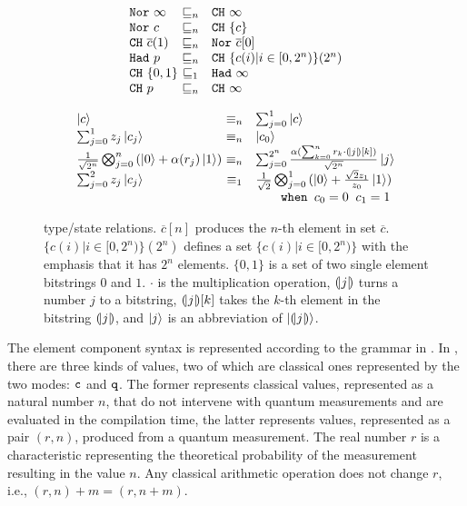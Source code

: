 \begin{figure}
{\small
{\hspace*{-6em}
\begin{minipage}[t]{0.4\textwidth}
\begin{center}
 \[
  \begin{array}{l@{~}cl}
  \tnor{\infty} &\sqsubseteq_n& \tch{\infty}\\
  \tnor{c} &\sqsubseteq_n& \tch{\{c\}}\\
  \tch{\overline{c}(1)} &\sqsubseteq_n& \tnor{\overline{c}[0]}\\
  \thad{p} &\sqsubseteq_n& \tch{\{c(i)|i\in[0,2^n)\}(2^n)}\\
  \tch{\{0,1\}} &\sqsubseteq_1& \thad{\infty}\\
  \tch{p} &\sqsubseteq_n& \tch{\infty}
    \end{array}
  \]
\end{center}
  \label{fig:qafny-subtype}
\end{minipage}
\qquad
\begin{minipage}[t]{0.45\textwidth}
\begin{center}
   \[
   \begin{array}{l@{~}cl}
  \ket{c} &\equiv_n& \sch{1}{ }{c}\\
  \sch{1}{z_j}{c_j} &\equiv_n& \ket{c_0}\\
  \shad{2^n}{n}{\alpha(r_j)} &\equiv_n& \sch{2^n}{\frac{\alpha(\sum_{k=0}^{n} r_k \cdot \tos{j}[k])}{\sqrt{2^n}}}{j}\\
  \sch{2}{z_j}{c_j} &\equiv_1& \shad{2}{1}{\frac{\sqrt{2}z_1}{z_0}}\\
   &&\qquad\texttt{when }c_0=0\;\;c_1=1
    \end{array}
 \]
\end{center}
  \label{fig:qafny-sequiv}
\end{minipage}
  \caption{\qafny type/state relations. $\overline{c}[n]$ produces the $n$-th element in set $\overline{c}$. $\{c(i)|i\in[0,2^n)\}(2^n)$ defines a set $\{c(i)|i\in[0,2^n)\}$ with the emphasis that it has $2^n$ elements. $\{0,1\}$ is a set of two single element bitstrings $0$ and $1$. $\cdot$ is the multiplication operation, $(\!| j |\!)$ turns a number $j$ to a bitstring, $(\!| j |\!)[k]$ takes the $k$-th element in the bitstring $(\!| j |\!)$, and $\left\vert{j}\right\rangle$ is an abbreviation of $\left\vert{(\!| j |\!)}\right\rangle$.}
  \label{fig:qafny-eq}
}
}
\end{figure}

The \qafny element component syntax is represented according to the grammar in . 
In \qafny, there are three kinds of values, two of which are classical ones represented by the two modes: $\texttt{c}$ and $\texttt{q}$.
The former represents classical values, represented as a natural number $n$, that do not intervene with quantum measurements and are evaluated in the compilation time, the latter represents values, represented as a pair $(r,n)$, produced from a quantum measurement. The real number $r$ is a characteristic representing the theoretical probability of the measurement resulting in the value $n$.
Any classical arithmetic operation does not change $r$, i.e., $(r,n)+m=(r,n+m)$. 


